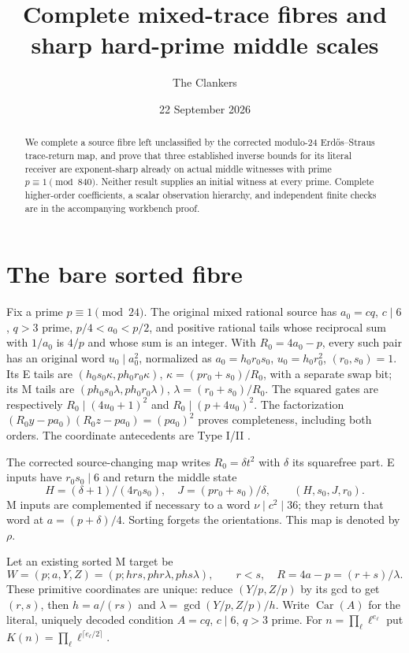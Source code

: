\documentclass[10pt,reqno]{amsart}
\title{Complete mixed-trace fibres and sharp hard-prime middle scales}
\author{The Clankers}\date{22 September 2026}
\begin{document}
\begin{abstract}
We complete a source fibre left unclassified by the corrected modulo-24
Erd\H{o}s--Straus trace-return map, and prove that three established inverse
bounds for its literal receiver are exponent-sharp already on actual middle
witnesses with prime $p\equiv1\pmod{840}$. Neither result supplies an initial
witness at every prime. Complete higher-order coefficients, a scalar
observation hierarchy, and independent finite checks are in the accompanying
workbench proof.
\end{abstract}
\maketitle

\section{The bare sorted fibre}
Fix a prime $p\equiv1\pmod{24}$. The original mixed rational source has
$a_0=cq$, $c\mid6$, $q>3$ prime, $p/4<a_0<p/2$, and positive rational tails
whose reciprocal sum with $1/a_0$ is $4/p$ and whose sum is an integer.
With $R_0=4a_0-p$, every such pair has an original word $u_0\mid a_0^2$,
normalized as $a_0=h_0r_0s_0$, $u_0=h_0r_0^2$, $(r_0,s_0)=1$.
Its E tails are $(h_0s_0\kappa,p h_0r_0\kappa)$,
$\kappa=(pr_0+s_0)/R_0$, with a separate swap bit; its M tails are
$(p h_0s_0\lambda,p h_0r_0\lambda)$, $\lambda=(r_0+s_0)/R_0$.
The squared gates are respectively $R_0\mid(4u_0+1)^2$ and
$R_0\mid(p+4u_0)^2$. The factorization
$(R_0y-pa_0)(R_0z-pa_0)=(pa_0)^2$ proves completeness, including both orders.
The coordinate antecedents are Type I/II \citep{ET}.

The corrected source-changing map \citep{Mixed,Composite} writes
$R_0=\delta t^2$ with $\delta$ its squarefree part. E inputs have
$r_0s_0\mid6$ and return the middle state
\[
 H=(\delta+1)/(4r_0s_0),\quad J=(pr_0+s_0)/\delta,
 \qquad (H,s_0,J,r_0).
\]
M inputs are complemented if necessary to a word $\nu\mid c^2\mid36$;
they return that word at $a=(p+\delta)/4$. Sorting forgets the orientations.
This map is denoted by $\rho$.

Let an existing sorted M target be
\[
 W=(p;a,Y,Z)=(p;hrs,phr\lambda,phs\lambda),\qquad r<s,
 \quad R=4a-p=(r+s)/\lambda.
\]
These primitive coordinates are unique: reduce $(Y/p,Z/p)$ by its gcd to
get $(r,s)$, then $h=a/(rs)$ and $\lambda=\gcd(Y/p,Z/p)/h$.
Write $\operatorname{Car}(A)$ for the literal, uniquely decoded condition
$A=cq$, $c\mid6$, $q>3$ prime.
For $n=\prod_\ell\ell^{e_\ell}$ put
$K(n)=\prod_\ell\ell^{\lceil e_\ell/2\rceil}$.
\end{document}
